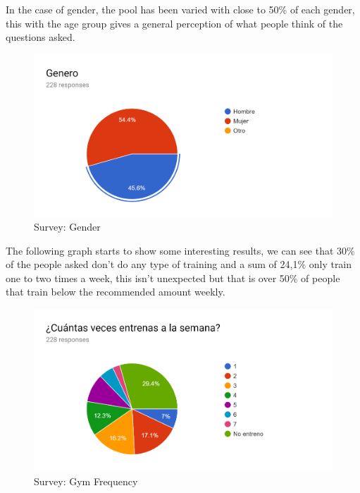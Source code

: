 In the case of gender, the pool has been varied with close to 50\% of each gender, this with the age group gives a general perception of what people think of the questions asked.

\begin{center}
	\begin{figure}[h!]
		\centering
		\includegraphics[scale=0.25]{./images/4-genero}
		\caption{Survey: Gender}
		\label{4_genero}
	\end{figure}
\end{center}

The following graph starts to show some interesting results, we can see that 30\% of the people asked don’t do any type of training and a sum of 24,1\% only train one to two times a week, this isn’t unexpected but that is over 50\% of people that train below the recommended amount weekly.

\begin{center}
	\begin{figure}[h!]
		\centering
		\includegraphics[scale=1]{./images/4-exe-freq}
		\caption{Survey: Gym Frequency}
		\label{4_exe_freq}
	\end{figure}
\end{center}

